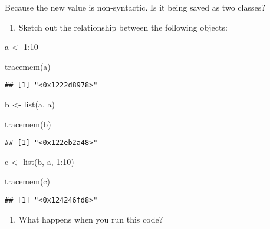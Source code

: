 \documentclass[
]{article}
\newenvironment{Shaded}{\begin{snugshade}}{\end{snugshade}}
\newcommand{\DecValTok}[1]{\textcolor[rgb]{0.00,0.00,0.81}{#1}}
\newcommand{\FunctionTok}[1]{\textcolor[rgb]{0.00,0.00,0.00}{#1}}
\newcommand{\NormalTok}[1]{#1}
\newcommand{\OtherTok}[1]{\textcolor[rgb]{0.56,0.35,0.01}{#1}}
\newcommand{\SpecialCharTok}[1]{\textcolor[rgb]{0.00,0.00,0.00}{#1}}
\providecommand{\tightlist}{%
  \setlength{\itemsep}{0pt}\setlength{\parskip}{0pt}}
\begin{document}
Because the new value is non-syntactic. Is it being saved as two
classes?

\begin{enumerate}
\def\labelenumi{\arabic{enumi}.}
\setcounter{enumi}{2}
\tightlist
\item
  Sketch out the relationship between the following objects:
\end{enumerate}

\begin{Shaded}
\begin{Highlighting}[]
\NormalTok{a }\OtherTok{\textless{}{-}} \DecValTok{1}\SpecialCharTok{:}\DecValTok{10}

\FunctionTok{tracemem}\NormalTok{(a)}
\end{Highlighting}
\end{Shaded}

\begin{verbatim}
## [1] "<0x1222d8978>"
\end{verbatim}

\begin{Shaded}
\begin{Highlighting}[]
\NormalTok{b }\OtherTok{\textless{}{-}} \FunctionTok{list}\NormalTok{(a, a)}

\FunctionTok{tracemem}\NormalTok{(b)}
\end{Highlighting}
\end{Shaded}

\begin{verbatim}
## [1] "<0x122eb2a48>"
\end{verbatim}

\begin{Shaded}
\begin{Highlighting}[]
\NormalTok{c }\OtherTok{\textless{}{-}} \FunctionTok{list}\NormalTok{(b, a, }\DecValTok{1}\SpecialCharTok{:}\DecValTok{10}\NormalTok{)}

\FunctionTok{tracemem}\NormalTok{(c)}
\end{Highlighting}
\end{Shaded}

\begin{verbatim}
## [1] "<0x124246fd8>"
\end{verbatim}

\begin{enumerate}
\def\labelenumi{\arabic{enumi}.}
\setcounter{enumi}{3}
\tightlist
\item
  What happens when you run this code?
\end{enumerate}
\end{document}
